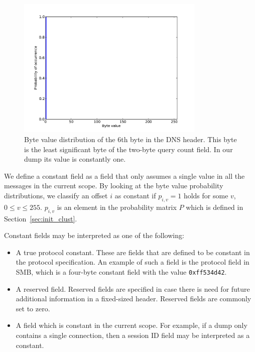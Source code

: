 \documentclass[a4paper]{report}
\begin{document}
\begin{figure}[h]
    \centering
    \includegraphics[width=0.8\textwidth]{img/const_one}
    \captionsetup{width=0.8\textwidth}
    \caption{Byte value distribution of the 6th byte in the DNS header. This
        byte is the least significant byte of the two-byte query count field.
        In our dump its value is constantly one.}
    \label{fig:const_one}
\end{figure}

We define a constant field as a field that only assumes a single value in all
the messages in the current scope. By looking at the byte value probability
distributions, we classify an offset $i$ as constant if $p_{i,v} = 1$ holds for
some $v$, $0 \le v \le 255$. $p_{i,v}$ is an element in the probability
matrix $P$ which is defined in Section~\ref{sec:init_clust}.

Constant fields may be interpreted as one of the following:
\begin{itemize}
    \item A true protocol constant. These are fields that are defined to be
        constant in the protocol specification. An example of such a field is
        the protocol field in SMB, which is a four-byte constant field with
        the value \verb+0xff534d42+.
    \item A reserved field. Reserved fields are specified in case there is need
        for future additional information in a fixed-sized header. Reserved
        fields are commonly set to zero.
    \item A field which is constant in the current scope. For example, if a dump
        only contains a single connection, then a session ID field may be
        interpreted as a constant.
\end{itemize}
\end{document}
